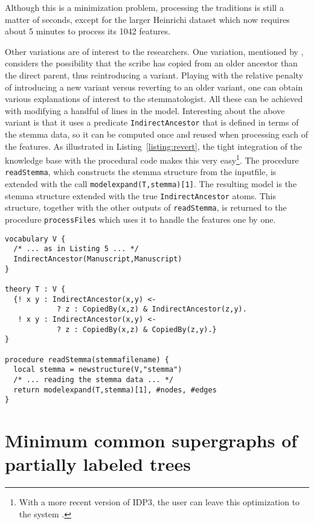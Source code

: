 \documentclass{tlp}
\newcommand{\idpdrie}{{\sc IDP3}\xspace}
\renewcommand{\|}{\ensuremath{\,|\,}}
\renewcommand{\|}{\,|\,}
\begin{document}
Although this is a minimization problem, processing the traditions is
still a matter of seconds, except for the larger Heinrichi dataset
which now requires about 5 minutes to process its 1042 features. 

Other variations are of interest to the researchers. One variation, mentioned by
, considers the possibility that the
scribe has copied from an older ancestor than the direct parent, thus
reintroducing a variant. Playing with the relative penalty
of introducing a new variant versus reverting to an older variant, one
can obtain various explanations of interest to the stemmatologist. All
these can be achieved with modifying a handful of lines in the
model. Interesting about the above variant is that it uses a predicate
\texttt{IndirectAncestor} that is defined in terms of the stemma data,
so it can be computed once and reused when processing each of the
features. As illustrated in
Listing~\ref{listing:revert}, the tight integration of the knowledge base with the
procedural code makes this very easy\footnote{With a more recent version of
  \idpdrie, the user can leave this optimization to the system \cite{tplp/JansenJJ13}.}.
%
The procedure \texttt{readStemma}, which
constructs the stemma structure from the inputfile, is extended with the
call \texttt{modelexpand(T,stemma)[1]}. The resulting model is the
stemma structure extended with the true \texttt{IndirectAncestor}
atoms. This structure, together with the other outputs of
\texttt{readStemma}, is returned to the procedure
\texttt{processFiles} which uses it to handle the features one by one.

\begin{lstlisting}[caption={Materializing a definition once and using
    the materialization many times.},label={listing:revert}]
vocabulary V {
  /* ... as in Listing 5 ... */
  IndirectAncestor(Manuscript,Manuscript)
}

theory T : V {
  {! x y : IndirectAncestor(x,y) <-
            ? z : CopiedBy(x,z) & IndirectAncestor(z,y).
   ! x y : IndirectAncestor(x,y) <-
            ? z : CopiedBy(x,z) & CopiedBy(z,y).}
}

procedure readStemma(stemmafilename) {
  local stemma = newstructure(V,"stemma")
  /* ... reading the stemma data ... */
  return modelexpand(T,stemma)[1], #nodes, #edges
}
\end{lstlisting}

\section{Minimum common supergraphs of partially labeled trees}\label{sec:CS}
\end{document}
